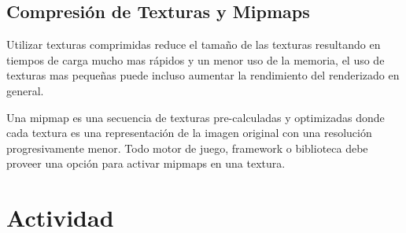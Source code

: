 \subsection{Compresión de Texturas y Mipmaps}
Utilizar texturas comprimidas reduce el tamaño de las texturas resultando en tiempos de carga mucho mas rápidos y un menor uso de la memoria, el uso de texturas mas pequeñas puede incluso aumentar la rendimiento del renderizado en general.

Una mipmap es una secuencia de texturas pre-calculadas y optimizadas donde cada textura es una representación de la imagen original con una resolución progresivamente menor. Todo motor de juego, framework o biblioteca debe proveer una opción para activar mipmaps en una textura.

\section{Actividad}
